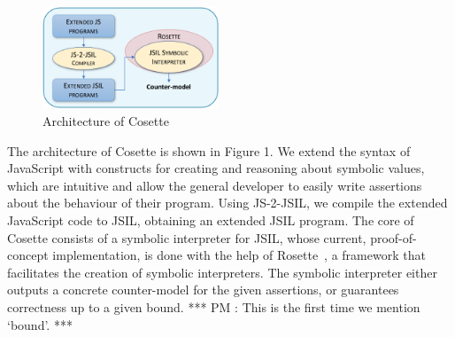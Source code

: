 \documentclass[sigconf, anonymous, review]{acmart}
\def\jsinline{\lstinline[language=JavaScript, basicstyle=\small]}
\newcommand{\jsil}{JSIL\xspace}
\newcommand{\JSComp}{JS-2-JSIL\xspace}
\newcommand{\cosette}{Cosette\xspace}
\newcommand{\myparagraph}[1]{\smallskip\noindent {\bf #1.}\hspace{1pt}}
\newcommand{\pmaxinline}[1]{ {\color{blue} *** PM : #1 ***} }
\begin{document}
\begin{figure}
\vspace*{-0.45cm}
\centering
\includegraphics[width=0.47\textwidth]{figures/jilette_blue.png}
\vspace*{-0.23cm}
\caption{Architecture of \cosette}
\vspace*{-0.4cm}
\label{fig:jilette:diagram}
\end{figure}

\myparagraph{Architecture} The architecture of \cosette is shown in Figure 1. We extend the syntax of JavaScript with constructs for creating and reasoning about symbolic values, which are intuitive and allow the general developer to easily write assertions about the behaviour of their program. Using \JSComp, we compile the extended JavaScript code to \jsil, obtaining an extended \jsil program. The core of \cosette consists of a symbolic interpreter for
\jsil, whose current, proof-of-concept implementation, is done with the help of Rosette~\cite{Rosette2,Rosette1}, a framework that facilitates the creation of symbolic interpreters. The symbolic interpreter either outputs a concrete counter-model for the given assertions, or guarantees correctness up to a given bound. \pmaxinline{This is the first time we mention `bound'.}

\end{document}
